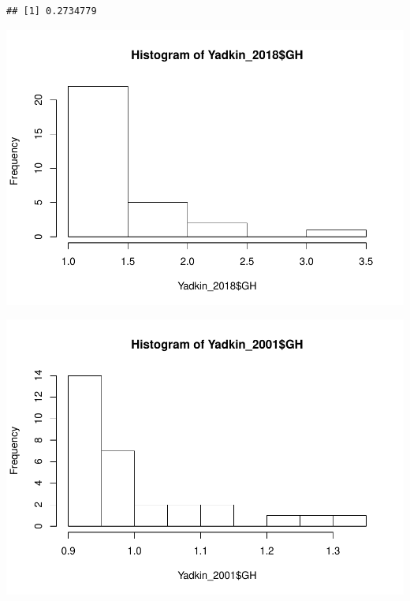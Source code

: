 \documentclass[12pt,]{article}
\newenvironment{Shaded}{\begin{snugshade}}{\end{snugshade}}
\newcommand{\DecValTok}[1]{\textcolor[rgb]{0.00,0.00,0.81}{#1}}
\newcommand{\KeywordTok}[1]{\textcolor[rgb]{0.13,0.29,0.53}{\textbf{#1}}}
\newcommand{\NormalTok}[1]{#1}
\newcommand{\OperatorTok}[1]{\textcolor[rgb]{0.81,0.36,0.00}{\textbf{#1}}}
\begin{document}
\begin{verbatim}
## [1] 0.2734779
\end{verbatim}

\begin{Shaded}
\end{Shaded}

\includegraphics{Project_Template_files/figure-latex/T-Test-1.pdf}

\begin{Shaded}
\end{Shaded}

\includegraphics{Project_Template_files/figure-latex/T-Test-2.pdf}
\end{document}
